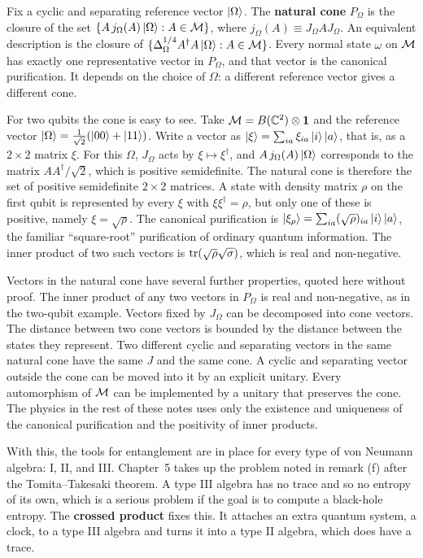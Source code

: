 Fix a cyclic and separating reference vector $\ket\Omega$. The \textbf{natural cone} $P_\Omega$ is the closure
of the set $\{A\,j_\Omega(A)\ket\Omega : A\in\mathcal{M}\}$, where $j_\Omega(A)\equiv J_\Omega AJ_\Omega$. An
equivalent description is the closure of $\{\Delta_\Omega^{1/4}A^\dagger A\ket\Omega : A\in\mathcal{M}\}$. Every normal
state $\omega$ on $\mathcal{M}$ has exactly one representative vector in $P_\Omega$, and that vector is the canonical
purification. It depends on the choice of $\Omega$: a different reference vector gives a different cone.

For two qubits the cone is easy to see. Take $\mathcal{M}=B(\mathbb C^2)\otimes\mathbf{1}$ and the reference vector
$\ket\Omega=\tfrac1{\sqrt2}(\ket{00}+\ket{11})$. Write a vector as $\ket\xi=\sum_{ia}\xi_{ia}\ket{i}\ket{a}$,
that is, as a $2\times2$ matrix $\xi$. For this $\Omega$, $J_\Omega$ acts by $\xi\mapsto\xi^\dagger$, and
$A\,j_\Omega(A)\ket\Omega$ corresponds to the matrix $A A^\dagger/\sqrt2$, which is positive semidefinite. The
natural cone is therefore the set of positive semidefinite $2\times2$ matrices. A state with density matrix
$\rho$ on the first qubit is represented by every $\xi$ with $\xi\xi^\dagger=\rho$, but only one of these is
positive, namely $\xi=\sqrt\rho$. The canonical purification is
$\ket{\xi_\rho}=\sum_{ia}(\sqrt\rho)_{ia}\ket i\ket a$, the familiar ``square-root'' purification of ordinary
quantum information. The inner product of two such vectors is $\operatorname{tr}(\sqrt{\rho}\sqrt{\sigma})$, which is real
and non-negative.

Vectors in the natural cone have several further properties, quoted here without proof. The inner product of
any two vectors in $P_\Omega$ is real and non-negative, as in the two-qubit example. Vectors fixed by $J_\Omega$ can be decomposed into cone vectors. The
distance between two cone vectors is bounded by the distance between the states they represent. Two different
cyclic and separating vectors in the same natural cone have the same $J$ and the same cone. A cyclic and
separating vector outside the cone can be moved into it by an explicit unitary. Every automorphism of $\mathcal{M}$ can
be implemented by a unitary that preserves the cone. The physics in the rest of these notes uses only the
existence and uniqueness of the canonical purification and the positivity of inner products.

\bigskip
\noindent With this, the tools for entanglement are in place for every type of von Neumann algebra: I, II, and
III. Chapter~5 takes up the problem noted in remark (f) after the Tomita--Takesaki theorem. A type III algebra
has no trace and so no entropy of its own, which is a serious problem if the goal is to compute a black-hole
entropy. The \textbf{crossed product} fixes this. It attaches an extra quantum system, a clock, to a type III
algebra and turns it into a type II algebra, which does have a trace.
